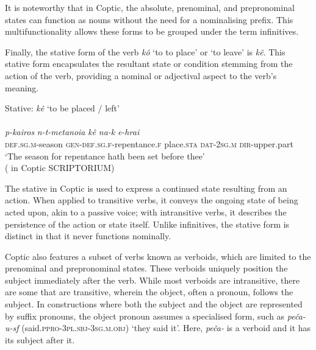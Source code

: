 \documentclass[output=paper,colorlinks,citecolor=brown ,chinesefont]{langscibook}
\begin{document}
It is noteworthy that in Coptic, the absolute, prenominal, and prepronominal states can function as nouns without the need for a nominalising prefix. This multifunctionality allows these forms to be grouped under the term infinitives.

Finally, the stative form of the verb  \textit{kô} ‘to to place' or ‘to leave' is  \textit{kê}. This stative form encapsulates the resultant state or condition stemming from the action of the verb, providing a nominal or adjectival aspect to the verb’s meaning.

\begin{exe}
    \ex Stative:  \textit{kê} ‘to be placed / left' \\
    \glll {}									  \\
    \textit{p-kairos} 		\textit{n-t-metanoia} 			\textit{kê} 		\textit{na-k}	 \textit{e-hrai} \\
\textsc{def}.\textsc{sg}.\textsc{m}-season 	\textsc{gen}-\textsc{def}.\textsc{sg}.\textsc{f}-repentance.\textsc{f} place.\textsc{sta} 	\textsc{dat}-2\textsc{sg}.\textsc{m}  \textsc{dir}-upper.part \\
\glt ‘The season for repentance hath been set before thee' \\
\hspace*{\fill}( in Coptic SCRIPTORIUM)
\end{exe}

The stative in Coptic is used to express a continued state resulting from an action. When applied to transitive verbs, it conveys the ongoing state of being acted upon, akin to a passive voice; with intransitive verbs, it describes the persistence of the action or state itself. Unlike infinitives, the stative form is distinct in that it never functions nominally.

Coptic also features a subset of verbs known as verboids, which are limited to the prenominal and prepronominal states. These verboids uniquely position the subject immediately after the verb. While most verboids are intransitive, there are some that are transitive, wherein the object, often a pronoun, follows the subject. In constructions where both the subject and the object are represented by suffix pronouns, the object pronoun assumes a specialised form, such as  \textit{peča-u-sf} (said.\textsc{ppro}-3\textsc{pl}.\textsc{sbj}-3\textsc{sg}.\textsc{m}.\textsc{obj}) ‘they said it'. Here,  \textit{peča-} is a verboid and it has its subject after it.
\end{document}
